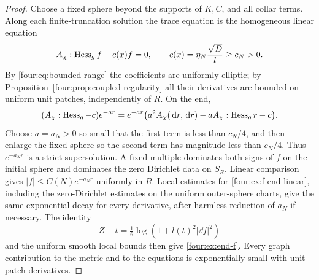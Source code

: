 \begin{proof}
Choose a fixed sphere beyond the supports of $K,C$, and all collar
terms.  Along each finite-truncation solution the trace equation is
the homogeneous linear equation
\begin{equation}\label{four:ex:f-end-linear}
 A_\chi:\operatorname{Hess}_g f-c(x)f=0,\qquad
 c(x)=\eta_N\frac{\sqrt D}{l}\ge c_N>0.
\end{equation}
By \eqref{four:eq:bounded-range} the coefficients are uniformly elliptic;
by Proposition~\ref{four:prop:coupled-regularity} all their derivatives are
bounded on uniform unit patches, independently of $R$.  On the end,
\[
 (A_\chi:\operatorname{Hess}_g-c)e^{-ar}
 =e^{-ar}\bigl(a^2A_\chi(\,\mathrm d r,\,\mathrm d r)
          -aA_\chi:\operatorname{Hess}_g r-c\bigr).
\]
Choose $a=a_N>0$ so small that the first term is less than $c_N/4$,
and then enlarge the fixed sphere so the second term has magnitude
less than $c_N/4$.  Thus $e^{-a_Nr}$ is a strict supersolution.
A fixed multiple dominates both signs of $f$ on the initial sphere
and dominates the zero Dirichlet data on $S_R$.  Linear comparison
gives $|f|\le C(N)e^{-a_Nr}$ uniformly in $R$.  Local estimates for
\eqref{four:ex:f-end-linear}, including the zero-Dirichlet estimates on the
uniform outer-sphere charts, give the same exponential decay for
every derivative, after harmless reduction of $a_N$ if necessary.
The identity
\[
 Z-t=\tfrac16\log(1+l(t)^2|\dd f|^2)
\]
and the uniform smooth local bounds then give
\eqref{four:ex:end-f}.  Every graph contribution to the metric and to the
equations is exponentially small with unit-patch derivatives.


\end{proof}
